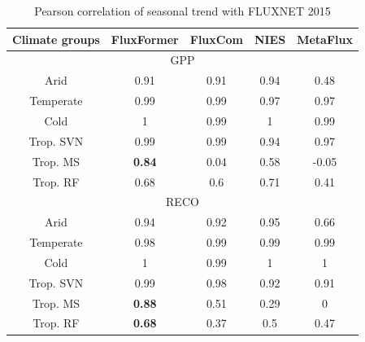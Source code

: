 \begin{table}[!ht]
    \centering
    \caption{Pearson correlation of seasonal trend with FLUXNET 2015}
    \begin{tabular}{ccccc}
        \hline
        Climate groups & FluxFormer & FluxCom & NIES & MetaFlux  \\ \hline
        \multicolumn{5}{c}{GPP}   \\ \hline 
        Arid & 0.91 & 0.91 & 0.94 & 0.48  \\ \hline 
        Temperate & 0.99 & 0.99 & 0.97 & 0.97  \\ \hline 
        Cold & 1 & 0.99 & 1 & 0.99  \\ \hline 
        Trop. SVN & 0.99 & 0.99 & 0.94 & 0.97  \\ \hline 
        Trop. MS & \textbf{0.84} & 0.04 & 0.58 & -0.05  \\ \hline 
        Trop. RF & 0.68 & 0.6 & 0.71 & 0.41  \\ \hline 
        \multicolumn{5}{c}{RECO}   \\ \hline 
        Arid & 0.94 & 0.92 & 0.95 & 0.66  \\ \hline 
        Temperate & 0.98 & 0.99 & 0.99 & 0.99  \\ \hline 
        Cold & 1 & 0.99 & 1 & 1  \\ \hline 
        Trop. SVN & 0.99 & 0.98 & 0.92 & 0.91  \\ \hline 
        Trop. MS & \textbf{0.88} & 0.51 & 0.29 & 0  \\ \hline 
        Trop. RF & \textbf{0.68} & 0.37 & 0.5 & 0.47  \\ \hline 
    \end{tabular}
    \label{tab:chap6_seasonr}
\end{table}

